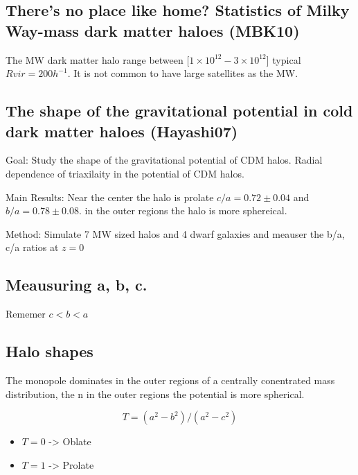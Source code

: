 \documentclass[12pt]{article}
\begin{document}
\subsection{There’s no place like home? Statistics of Milky Way-mass dark matter
haloes (MBK10)}

The MW dark matter halo range between [$1\times 10^{12} - 3\times 10^{12}$]
typical $Rvir = 200 h^{-1}$. It is not common to have large satellites as
the MW. 

\subsection{The shape of the gravitational potential in cold dark matter haloes (Hayashi07)}

Goal: Study the shape of the gravitational potential of CDM halos. Radial dependence of triaxilaity in the potential of CDM halos.
 
Main Results: Near the center the halo is prolate $c/a = 0.72 \pm 0.04$
and $b/a = 0.78 \pm 0.08$. in the outer regions the halo is more sphereical.

Method: Simulate 7 MW sized halos and 4 dwarf galaxies and meauser the b/a, c/a ratios at $z=0$
\subsection{Meausuring a, b, c.}

Rememer $c<b<a$

\subsection{Halo shapes}

The monopole dominates in the outer regions of a centrally conentrated mass distribution, the n in the outer
regions the potential is more spherical. 

\begin{equation}
T = (a^2 - b^2)/(a^2-c^2)
\end{equation}

\begin{itemize}
\item $T=0$ -> Oblate
\item $T=1$ -> Prolate 
\end{itemize}
\end{document}
